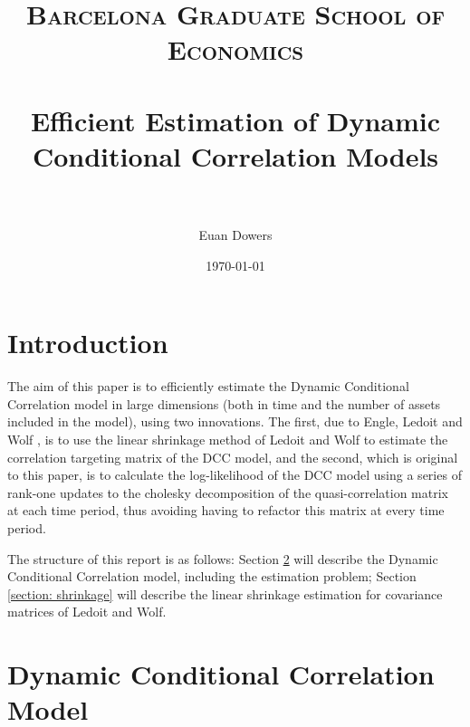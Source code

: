 \documentclass{article} %
\title{
\normalfont \normalsize
\textsc{Barcelona Graduate School of Economics} \\ [20pt] %
\horrule{0.5pt} \\[0.1cm] %
\Large Efficient Estimation of Dynamic Conditional Correlation Models \\ %
\horrule{0.5pt} \\[0.1cm] %
}
\author{Euan Dowers} %
\date{\normalsize\today} %
\numberwithin{equation}{section} %
\numberwithin{figure}{section} %
\numberwithin{table}{section} %
\begin{document}
\maketitle %

\pagebreak

\tableofcontents

\pagebreak


\section{Introduction}

The aim of this paper is to efficiently estimate the Dynamic Conditional Correlation model in large dimensions (both in time and the number of assets included in the model), using two innovations. The first, due to Engle, Ledoit and Wolf \cite{engle ledoit and wolf}, is to use the linear shrinkage method of Ledoit and Wolf \cite{ledoit and wolf} to estimate the correlation targeting matrix of the DCC model, and the second, which is original to this paper, is to calculate the log-likelihood of the DCC model using a series of rank-one updates to the cholesky decomposition of the quasi-correlation matrix at each time period, thus avoiding having to refactor this matrix at every time period.

The structure of this report is as follows: Section \ref{section: dcc} will describe the Dynamic Conditional Correlation model, including the estimation problem; Section \ref{section: shrinkage} will describe the linear shrinkage estimation for covariance matrices of Ledoit and Wolf.


\section{Dynamic Conditional Correlation Model} \label{section: dcc}
\end{document}
